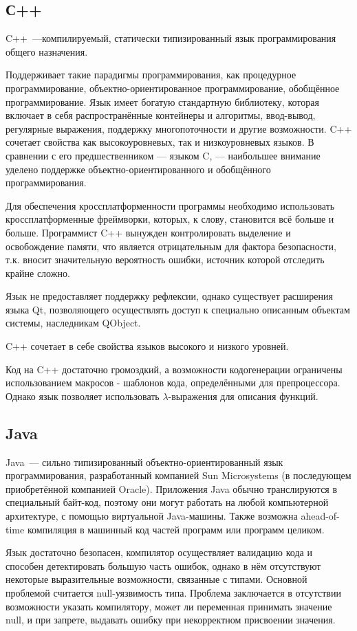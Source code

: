 \subsection{С++}
C++~---компилируемый, статически типизированный язык программирования общего назначения.

Поддерживает такие парадигмы программирования, как процедурное программирование, объектно-ориентированное программирование, обобщённое программирование. 
Язык имеет богатую стандартную библиотеку, которая включает в себя распространённые контейнеры и алгоритмы, ввод-вывод, регулярные выражения, поддержку многопоточности и другие возможности. 
C++ сочетает свойства как высокоуровневых, так и низкоуровневых языков. 
В сравнении с его предшественником — языком C, — наибольшее внимание уделено поддержке объектно-ориентированного и обобщённого программирования.

Для обеспечения кроссплатформенности программы необходимо использовать кроссплатформенные фреймворки, которых, к слову, становится всё больше и больше.
Программист C++ вынужден контролировать выделение и освобождение памяти, что является отрицательным для фактора безопасности, т.к. вносит значительную вероятность ошибки, источник которой отследить крайне сложно.

Язык не предоставляет поддержку рефлексии, однако существует расширения языка Qt, позволяющего осуществлять доступ к специально описанным объектам системы, наследникам QObject.

C++ сочетает в себе свойства языков высокого и низкого уровней.

Код на C++ достаточно громоздкий, а возможности кодогенерации ограничены использованием макросов - шаблонов кода, определёнными для препроцессора. 
Однако язык позволяет использовать $ \lambda $-выражения для описания функций.

\subsection{Java}

Java~--- сильно типизированный объектно-ориентированный язык программирования, разработанный компанией Sun Microsystems (в последующем приобретённой компанией Oracle). 
Приложения Java обычно транслируются в специальный байт-код, поэтому они могут работать на любой компьютерной архитектуре, с помощью виртуальной Java-машины.
Также возможна ahead-of-time компиляция в машинный код частей программ или программ целиком.

Язык достаточно безопасен, компилятор осуществляет валидацию кода и способен детектировать большую часть ошибок, однако в нём отсутствуют некоторые выразительные возможности, связанные с типами. 
Основной проблемой считается null-уязвимость типа. 
Проблема заключается в отсутствии возможности указать компилятору, может ли переменная принимать значение null, и при запрете, выдавать ошибку при некорректном присвоении значения.

